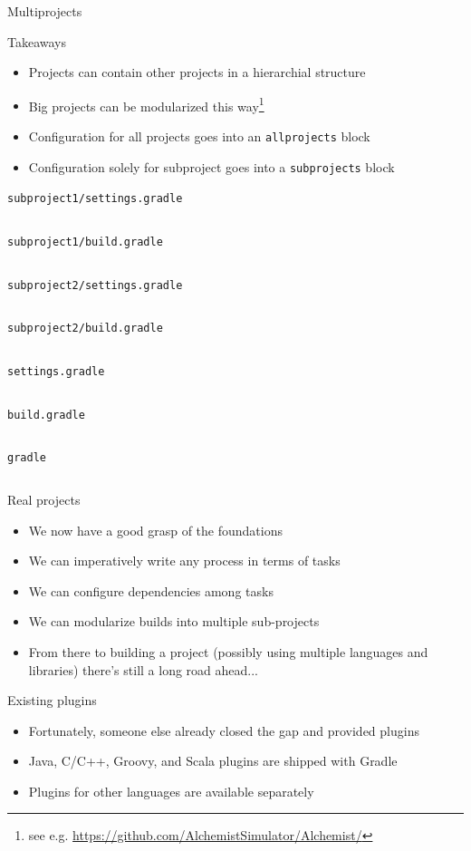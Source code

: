 \documentclass[presentation]{beamer}
\newcommand{\codefile}[4]{
	\begin{block}{\texttt{#2}}
		\inputminted[fontsize=#3,linenos=true,breaklines=true]{#4}{"workspace/#1/#2"}
	\end{block}
}
\newcommand{\groovy}[3]{\codefile{#1}{#2}{#3}{groovy}}
\newcommand{\terminal}[3]{\codefile{#1}{#2}{#3}{text}}
\begin{document}
\begin{frame}{Multiprojects}
    \begin{block}{Takeaways}
        \begin{itemize}
            \item Projects can contain other projects in a hierarchial structure
            \item Big projects can be modularized this way\footnote{see e.g. \url{https://github.com/AlchemistSimulator/Alchemist/}}
            \item Configuration for all projects goes into an \texttt{allprojects} block
            \item Configuration solely for subproject goes into a \texttt{subprojects} block
        \end{itemize}
    \end{block}
    \terminal{12-Multiproject}{subproject1/settings.gradle}{\scriptsize}
    \groovy{12-Multiproject}{subproject1/build.gradle}{\scriptsize}
    \terminal{12-Multiproject}{subproject2/settings.gradle}{\scriptsize}
    \groovy{12-Multiproject}{subproject2/build.gradle}{\scriptsize}
    \terminal{12-Multiproject}{settings.gradle}{\scriptsize}
    \groovy{12-Multiproject}{build.gradle}{\scriptsize}
    \terminal{12-Multiproject}{gradle}{\scriptsize}
\end{frame}

\begin{frame}[fragile]{Real projects}
    \begin{itemize}
        \item We now have a good grasp of the foundations
        \item We can imperatively write any process in terms of tasks
        \item We can configure dependencies among tasks
        \item We can modularize builds into multiple sub-projects
        \item From there to building a project (possibly using multiple languages and libraries) there's still a long road ahead...
    \end{itemize}
    \begin{block}{Existing plugins}
        \begin{itemize}
            \item Fortunately, someone else already closed the gap and provided plugins
            \item Java, C/C++, Groovy, and Scala plugins are shipped with Gradle
            \item Plugins for other languages are available separately
        \end{itemize}
    \end{block}
\end{frame}
\end{document}

